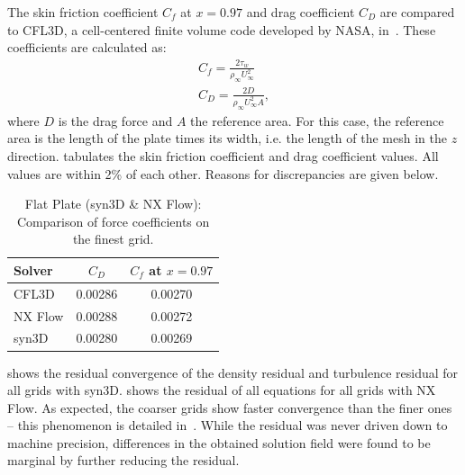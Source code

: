 The skin friction coefficient $C_f$ at $x = 0.97$ and drag coefficient $C_D$ are compared to CFL3D, a cell-centered finite volume code developed by NASA, in~. These coefficients are calculated as:
\begin{align*}
    C_f = \frac{2\tau_w}{\rho_\infty U_\infty^2}\\
    C_D = \frac{2D}{\rho_\infty U_\infty^2 A},
\end{align*}
where $D$ is the drag force and $A$ the reference area. For this case, the reference area is the length of the plate times its width, i.e. the length of the mesh in the $z$ direction.  tabulates the skin friction coefficient and drag coefficient values.
All values are within 2\% of each other. Reasons for discrepancies are given below.
\begin{table}
\centering
\caption{Flat Plate (syn3D \& NX Flow): Comparison of force coefficients on the finest grid.}
\label{tab:flat}
\begin{tabular}{@{}lcc@{}}
    \toprule
    Solver & $C_D$ & $C_f$ at $x=0.97$ \\
    \midrule
    CFL3D & 0.00286 & 0.00270 \\
    NX Flow & 0.00288 & 0.00272 \\
    syn3D & 0.00280 & 0.00269\\
    \bottomrule
\end{tabular}
\end{table}
 shows the residual convergence of the density residual and turbulence residual for all grids with syn3D.  shows the residual of all equations for all grids with NX Flow. As expected, the coarser grids show faster convergence than the finer ones -- this phenomenon is detailed in~\cite{blazek2015computational}. While the residual was never driven down to machine precision, differences in the obtained solution field were found to be marginal by further reducing the residual.

